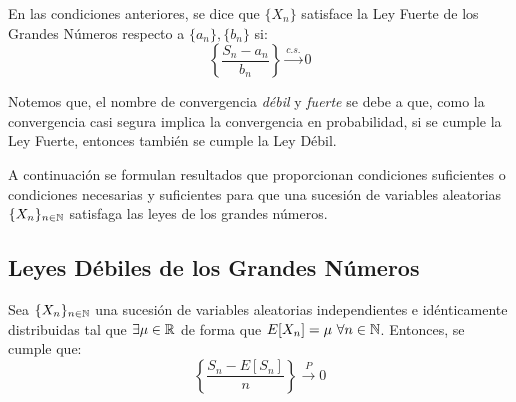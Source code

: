 \begin{definicion}
    En las condiciones anteriores, se dice que $\{X_n\}$ satisface la Ley Fuerte de los Grandes Números respecto a $\{a_n\}, \{b_n\}$ si:
    \begin{equation*}
        \left\{\frac{S_n - a_n}{b_n}\right\} \xrightarrow{c.s.} 0
    \end{equation*}
\end{definicion}

Notemos que, el nombre de convergencia \emph{débil} y \emph{fuerte} se debe a que, como la convergencia casi segura implica la convergencia en probabilidad, si se cumple la Ley Fuerte, entonces también se cumple la Ley Débil.

A continuación se formulan resultados que proporcionan condiciones suficientes o condiciones necesarias y suficientes para que una sucesión de variables aleatorias $\{X_n\}_{n\in \mathbb{N}}$ satisfaga las leyes de los grandes números.

\subsection{Leyes Débiles de los Grandes Números}
\begin{prop}
    Sea $\{X_n\}_{n\in \mathbb{N}}$ una sucesión de variables aleatorias independientes e idénticamente distribuidas tal que $\exists \mu\in \mathbb{R}$ de forma que $E[X_n]=\mu~\forall n\in \mathbb{N}$. Entonces, se cumple que:
    \begin{equation*}
        \left\{\frac{S_n-E[S_n]}{n}\right\} \xrightarrow{P} 0
    \end{equation*}
\end{prop}

